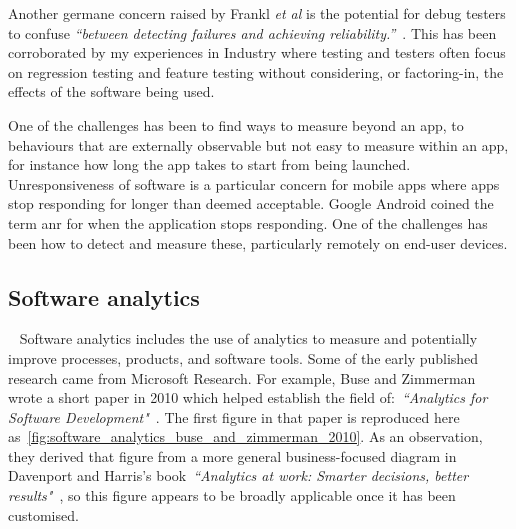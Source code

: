 Another germane concern raised by Frankl \emph{et al} is the potential for debug testers to confuse \emph{``between detecting failures and achieving reliability.''}~. This has been corroborated by my experiences in Industry where testing and testers often focus on regression testing and feature testing without considering, or factoring-in, the effects of the software being used.


One of the challenges has been to find ways to measure beyond an app, to behaviours that are externally observable but not easy to measure within an app, for instance how long the app takes to start from being launched. Unresponsiveness of software is a particular concern for mobile apps where apps stop responding for longer than deemed acceptable. Google Android coined the term \Gls{anr} for when the application stops responding. One of the challenges has been how to detect and measure these, particularly remotely on end-user devices. 


\subsection{Software analytics}~\label{rw-software-analytics-topic}
Software analytics includes the use of analytics to measure and potentially improve processes, products, and software tools. Some of the early published research came from Microsoft Research. For example, Buse and Zimmerman wrote a short paper in 2010 which helped establish the field of:~\emph{``Analytics for Software Development"}~. The first figure in that paper is reproduced here as~\ref{fig:software_analytics_buse_and_zimmerman_2010}. As an observation, they derived that figure from a more general business-focused diagram in Davenport and Harris's book~\emph{``Analytics at work: Smarter decisions, better results"}~, so this figure appears to be broadly applicable once it has been customised. %

